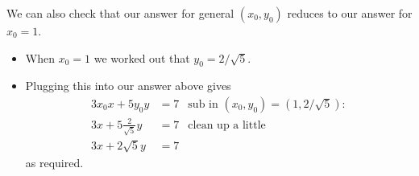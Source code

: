 \begin{eg}
\begin{itemize}
\end{itemize}
We can also check that our answer for general $(x_0,y_0)$ reduces to our answer
for $x_0=1$.
\begin{itemize}
 \item When $x_0=1$ we worked out that $y_0=2/\sqrt{5}$.
\item Plugging this into our answer above gives
\begin{align*}
  3x_0x+5y_0y &=7  &\text{sub in $(x_0,y_0)=(1,2/\sqrt{5})$}:\\
  3 x + 5 \frac{2}{\sqrt{5}} y &= 7 & \text{clean up a little}\\
  3x + 2\sqrt{5} y &=7
\end{align*}
as required.
\end{itemize}

\end{eg}


